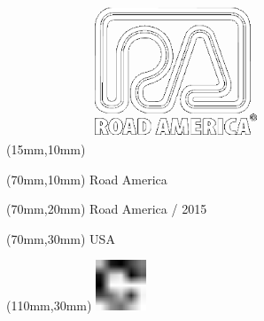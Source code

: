 \null\newpage
\begin{textblock*}{50mm}(15mm,10mm)%
\includegraphics[width=50mm]{LG/ROA.png}
\end{textblock*}
\begin{textblock*}{130mm}(70mm,10mm)%
{\fontsize{20}{20}\selectfont Road America}\\
\end{textblock*}
\begin{textblock*}{120mm}(70mm,20mm)%
{\fontsize{16}{16}\selectfont Road America / 2015}\\
\end{textblock*}
\begin{textblock*}{120mm}(70mm,30mm)%
{\fontsize{12}{12}\selectfont USA}
\end{textblock*}
\begin{textblock*}{30mm}(110mm,30mm)%
\centering
\includegraphics[height=15mm]{icons/fa-rotate-right.pdf}
\end{textblock*}
